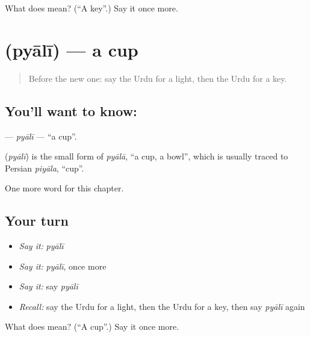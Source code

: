\begin{tcolorbox}[breakable,colback=teal!4,colframe=teal!35!black,title={Before you move on}]
What does  mean? (\textquotedblleft{}A key\textquotedblright{}.) Say it once more.
\end{tcolorbox}
\section[\texorpdfstring{\ur{پیالی} (pyālī)}{پیالی (pyālī)}]{ (pyālī) — a cup}

\label{lesson:UR-C60-pyali}



\begin{quote}
Before the new one: say the Urdu for a light, then the Urdu for a key.
\end{quote}

\subsection*{You'll want to know: }
\textbf{} — \emph{pyālī} — \textquotedblleft{}a cup\textquotedblright{}.

\begin{cousinweb}
\textbf{} (\emph{pyālī}) is the small form of \emph{pyālā}, \textquotedblleft{}a cup, a bowl\textquotedblright{}, which is usually traced to Persian \emph{piyāla}, \textquotedblleft{}cup\textquotedblright{}.
\end{cousinweb}

\begin{grammarlens}[title={What you've built}]
One more word for this chapter.
\end{grammarlens}

\subsection*{Your turn}
\begin{itemize}
\raggedright
  \item \emph{Say it:} \emph{pyālī}
  \item \emph{Say it:} \emph{pyālī}, once more
  \item \emph{Say it:} say \emph{pyālī}
  \item \emph{Recall:} say the Urdu for a light, then the Urdu for a key, then say \emph{pyālī} again
\end{itemize}

\begin{tcolorbox}[breakable,colback=teal!4,colframe=teal!35!black,title={Before you move on}]
What does  mean? (\textquotedblleft{}A cup\textquotedblright{}.) Say it once more.
\end{tcolorbox}
